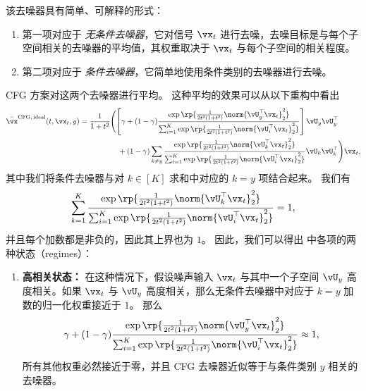 \documentclass[../../book-main_zh.tex]{subfiles}
\begin{document}
\begin{example}
    该去噪器具有简单、可解释的形式：
    \begin{enumerate}
        \item 第一项对应于 \textit{无条件去噪器}，它对信号 $\vx_t$ 进行去噪，去噪目标是与每个子空间相关的去噪器的平均值，其权重取决于 $\vx_t$ 与每个子空间的相关程度。
        \item 第二项对应于 \textit{条件去噪器}，它简单地使用条件类别的去噪器进行去噪。
    \end{enumerate}

    CFG 方案对这两个去噪器进行平均。
    这种平均的效果可以从以下重构中看出
    \begin{equation}\label{eq:cfg-denoiser-mog-low-rank-2}
        \begin{split}
            \bar{\vx}^{\mathrm{CFG,\,ideal}}(t, \vx_t, y)
            =
            \frac{1}{1 + t^{2}}
            &\Biggl(
                \left[\gamma + (1 - \gamma)
                    \frac{\exp\rp{\frac{1}{2t^{2}(1
                    + t^{2})}\norm{\vU_{y}^{\top}\vx_t}_{2}^{2}}}{\sum_{i
                        = 1}^{K}\exp\rp{\frac{1}{2t^{2}(1
                    + t^{2})}\norm{\vU_{i}^{\top}\vx_t}_{2}^{2}}}
                \right]
                \vU_{y}\vU_{y}^{\top}
                \\
                &\quad+
                (1 - \gamma)
                \sum_{k \neq y}\frac{\exp\rp{\frac{1}{2t^{2}(1
                + t^{2})}\norm{\vU_{k}^{\top}\vx_t}_{2}^{2}}}{\sum_{i
                    = 1}^{K}\exp\rp{\frac{1}{2t^{2}(1
                                +
                t^{2})}\norm{\vU_{i}^{\top}\vx_t}_{2}^{2}}}\vU_{k}\vU_{k}^{\top}
            \Biggr)
            \vx_t,
        \end{split}
    \end{equation}
    其中我们将条件去噪器与对 $k \in [K]$ 求和中对应的 $k=y$ 项结合起来。
    我们有
    \begin{equation}
        \sum_{k=1}^K
        \frac{\exp\rp{\frac{1}{2t^{2}(1
        + t^{2})}\norm{\vU_{k}^{\top}\vx_t}_{2}^{2}}}{\sum_{i
            = 1}^{K}\exp\rp{\frac{1}{2t^{2}(1
        + t^{2})}\norm{\vU_{i}^{\top}\vx_t}_{2}^{2}}}
        = 1,
    \end{equation}
    并且每个加数都是非负的，因此其上界也为 $1$。
    因此，我们可以得出  中各项的两种状态（regimes）：
    \begin{enumerate}
        \item \textbf{高相关状态：} 在这种情况下，假设噪声输入 $\vx_t$ 与其中一个子空间 $\vU_y$ 高度相关。如果 $\vx_t$ 与 $\vU_y$ 高度相关，那么无条件去噪器中对应于 $k=y$ 加数的归一化权重接近于 $1$。
            那么
            \begin{equation}
                \gamma + (1 - \gamma)
                \frac{\exp\rp{\frac{1}{2t^{2}(1
                + t^{2})}\norm{\vU_{y}^{\top}\vx_t}_{2}^{2}}}{\sum_{i
                    = 1}^{K}\exp\rp{\frac{1}{2t^{2}(1
                + t^{2})}\norm{\vU_{i}^{\top}\vx_t}_{2}^{2}}}
                \approx 1,
            \end{equation}
            所有其他权重必然接近于零，并且 CFG 去噪器近似等于与条件类别 $y$ 相关的去噪器。


\end{enumerate}
\end{example}
\end{document}
